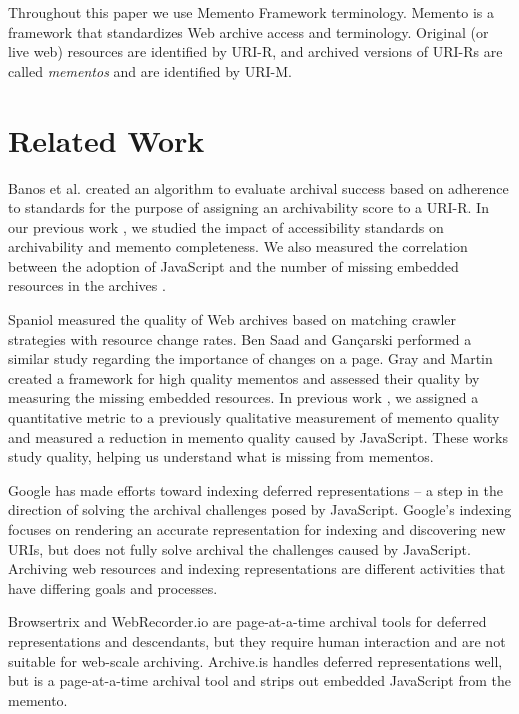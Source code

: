 \documentclass{sig-alternate}
\begin{document}
Throughout this paper we use Memento Framework terminology. Memento \cite{nelson:memento:tr} is a framework that standardizes Web archive access and terminology. Original (or live web) resources are identified by URI-R, and archived versions of URI-Rs are called \emph{mementos} and are identified by URI-M. 

\section{Related Work}
\label{priorwork}
Banos et al. \cite{ipresArchivability} created an algorithm to evaluate archival success based on adherence to standards for the purpose of assigning an archivability score to a URI-R. In our previous work \cite{kellyTPDL2013}, we studied the impact of accessibility standards on archivability and memento completeness. We also measured the correlation between the adoption of JavaScript and the number of missing embedded resources in the archives \cite{ijdl}. 

Spaniol \cite{spaniol9catch, spaniol2009data, Denev:2009:SFQ:1687627.1687694} measured the quality of Web archives based on matching crawler strategies with resource change rates. Ben Saad and Gan\c{c}arski \cite{saad2011} performed a similar study regarding the importance of changes on a page. Gray and Martin \cite{mementoQuality} created a framework for high quality mementos and assessed their quality by measuring the missing embedded resources. In previous work \cite{brunelleDamage}, we assigned a quantitative metric to a previously qualitative measurement of memento quality and measured a reduction in memento quality caused by JavaScript. These works study quality, helping us understand what is missing from mementos.

Google has made efforts toward indexing deferred representations \cite{googleJS} -- a step in the direction of solving the archival challenges posed by JavaScript. Google's indexing focuses on rendering an accurate representation for indexing and discovering new URIs, but does not fully solve archival the challenges caused by JavaScript. Archiving web resources and indexing representations are different activities that have differing goals and processes.

Browsertrix \cite{browsertrix} and WebRecorder.io \cite{webrecorder} are page-at-a-time archival tools for deferred representations and descendants, but they require human interaction and are not suitable for web-scale archiving. Archive.is \cite{archivetoday} handles deferred representations well, but is a page-at-a-time archival tool and strips out embedded JavaScript from the memento. 
\end{document}
